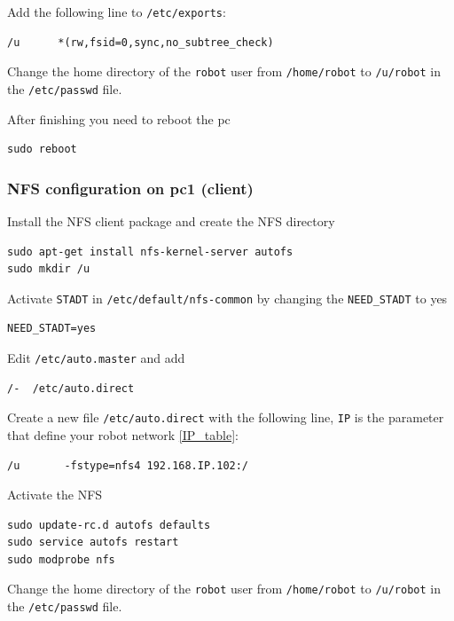 Add the following line to \texttt{/etc/exports}:

\begin{lstlisting}
/u      *(rw,fsid=0,sync,no_subtree_check)
\end{lstlisting}


Change the home directory of the \texttt{robot} user from \texttt{/home/robot} to \texttt{/u/robot} in the \texttt{/etc/passwd} file.

After finishing you need to reboot the pc

\begin{lstlisting}
sudo reboot
\end{lstlisting}

\subsubsection{NFS configuration on pc1 (client)}
Install the NFS client package and create the NFS directory

\begin{lstlisting}
sudo apt-get install nfs-kernel-server autofs
sudo mkdir /u
\end{lstlisting}

Activate \texttt{STADT} in \texttt{/etc/default/nfs-common} by changing the \texttt{NEED\_STADT} to yes

\begin{lstlisting} 
NEED_STADT=yes
\end{lstlisting}

Edit \texttt{/etc/auto.master} and add

\begin{lstlisting}
/-	/etc/auto.direct
\end{lstlisting}

Create a new file \texttt{/etc/auto.direct} with the following line, \texttt{IP} is the parameter that define your robot network \ref{IP_table}:

\begin{lstlisting}
/u       -fstype=nfs4 192.168.IP.102:/
\end{lstlisting}

Activate the NFS

\begin{lstlisting}
sudo update-rc.d autofs defaults
sudo service autofs restart
sudo modprobe nfs
\end{lstlisting}

Change the home directory of the \texttt{robot} user from \texttt{/home/robot} to \texttt{/u/robot} in the \texttt{/etc/passwd} file.

